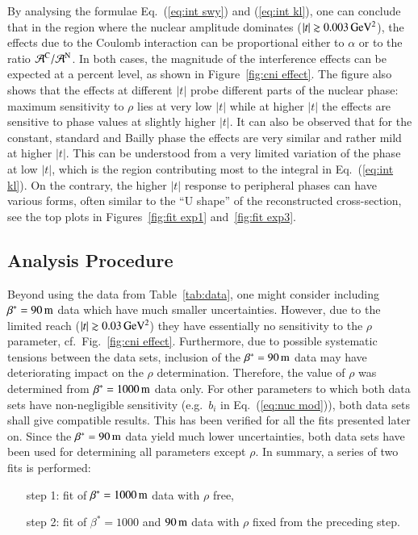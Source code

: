 By analysing the formulae Eq.~(\ref{eq:int swy}) and (\ref{eq:int kl}), one can conclude that in the region where the nuclear amplitude dominates ($|t| \gtrsim 0.003\,{\rm GeV^2}$), the effects due to the Coulomb interaction can be proportional either to $\alpha$ or to the ratio ${\cal A}^{\rm C} / {\cal A}^{\rm N}$. In both cases, the magnitude of the interference effects can be expected at a percent level, as shown in Figure~\ref{fig:cni effect}. The figure also shows that the effects at different $|t|$ probe different parts of the nuclear phase: maximum sensitivity to $\rho$ lies at very low $|t|$ while at higher $|t|$ the effects are sensitive to phase values at slightly higher $|t|$. It can also be observed that for the constant, standard and Bailly phase the effects are very similar and rather mild at higher $|t|$. This can be understood from a very limited variation of the phase at low $|t|$, which is the region contributing most to the integral in Eq.~(\ref{eq:int kl}). On the contrary, the higher $|t|$ response to peripheral phases can have various forms, often similar to the ``U shape'' of the reconstructed cross-section, see the top plots in Figures~\ref{fig:fit exp1} and~\ref{fig:fit exp3}.


\subsection{Analysis Procedure}
\label{sec:cni anal proc}

Beyond using the data from Table~\ref{tab:data}, one might consider including $\beta^* = 90\,{\rm m}$ data \cite{8tev-90m} which have much smaller uncertainties. However, due to the limited reach ($|t| \gtrsim 0.03\,{\rm GeV^2}$) they have essentially no sensitivity to the $\rho$ parameter, cf.~Fig.~\ref{fig:cni effect}. Furthermore, due to possible systematic tensions between the data sets, inclusion of the $\beta^* = 90\,{\rm m}$ data may have deteriorating impact on the $\rho$ determination. Therefore, the value of $\rho$ was determined from $\beta^* = 1000\,{\rm m}$ data only. For other parameters to which both data sets have non-negligible sensitivity (e.g.~$b_i$ in Eq.~(\ref{eq:nuc mod})), both data sets shall give compatible results. This has been verified for all the fits presented later on. Since the $\beta^* = 90\,{\rm m}$ data yield much lower uncertainties, both data sets have been used for determining all parameters except $\rho$. In summary, a series of two fits is performed:
\begin{enumerate}[leftmargin=2cm]
\item[step 1:] fit of $\beta^* = 1000\,{\rm m}$ data with $\rho$ free,
\item[step 2:] fit of $\beta^* = 1000$ and $90\,{\rm m}$ data with $\rho$ fixed from the preceding step.
\end{enumerate}

